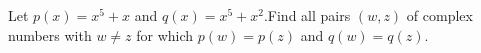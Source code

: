 \documentclass{article}
\begin{document}
\setlength{\parindent}{0pt}
Let $p(x)=x^{5}+x$ and $q(x)=x^{5}+x^{2}$.\newline Find all pairs $(w,z)$ of complex numbers with $w\ne z$ for which $p(w)=p(z)$ and $q(w)=q(z)$.
\end{document}
